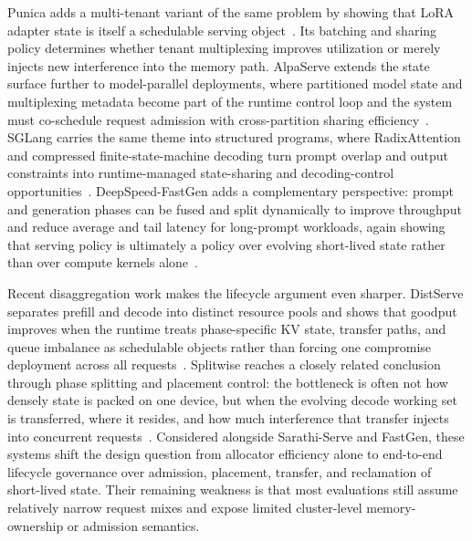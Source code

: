 \documentclass[acmsmall,screen,review]{acmart}
\begin{document}
Punica adds a multi-tenant variant of the same problem by showing that LoRA adapter state is itself a schedulable serving object~\cite{chen2024punica}. Its batching and sharing policy determines whether tenant multiplexing improves utilization or merely injects new interference into the memory path. AlpaServe extends the state surface further to model-parallel deployments, where partitioned model state and multiplexing metadata become part of the runtime control loop and the system must co-schedule request admission with cross-partition sharing efficiency~\cite{li2023alpaserve}. SGLang carries the same theme into structured programs, where RadixAttention and compressed finite-state-machine decoding turn prompt overlap and output constraints into runtime-managed state-sharing and decoding-control opportunities~\cite{zheng2023sglang}. DeepSpeed-FastGen adds a complementary perspective: prompt and generation phases can be fused and split dynamically to improve throughput and reduce average and tail latency for long-prompt workloads, again showing that serving policy is ultimately a policy over evolving short-lived state rather than over compute kernels alone~\cite{holmes2024fastgen}.

Recent disaggregation work makes the lifecycle argument even sharper. DistServe separates prefill and decode into distinct resource pools and shows that goodput improves when the runtime treats phase-specific KV state, transfer paths, and queue imbalance as schedulable objects rather than forcing one compromise deployment across all requests~\cite{zhong2024distserve}. Splitwise reaches a closely related conclusion through phase splitting and placement control: the bottleneck is often not how densely state is packed on one device, but when the evolving decode working set is transferred, where it resides, and how much interference that transfer injects into concurrent requests~\cite{patel2024splitwise}. Considered alongside Sarathi-Serve and FastGen, these systems shift the design question from allocator efficiency alone to end-to-end lifecycle governance over admission, placement, transfer, and reclamation of short-lived state. Their remaining weakness is that most evaluations still assume relatively narrow request mixes and expose limited cluster-level memory-ownership or admission semantics.
\end{document}
